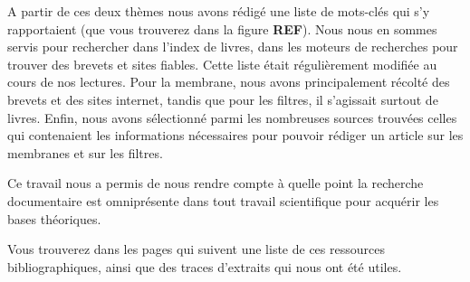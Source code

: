 \documentclass[a4paper, 11pt]{article}
\begin{document}
A partir de ces deux thèmes nous avons rédigé une liste de mots-clés qui s'y rapportaient (que vous trouverez dans la figure \textbf{REF}).%
 Nous nous en sommes servis pour rechercher dans l'index de livres, dans les moteurs de recherches pour trouver des brevets et sites fiables. Cette liste était régulièrement modifiée au cours de nos lectures. Pour la membrane, nous avons principalement récolté des brevets et des sites internet, tandis que pour les filtres, il s'agissait surtout de livres. 
Enfin, nous avons sélectionné parmi les nombreuses sources trouvées celles qui contenaient les informations nécessaires pour pouvoir rédiger un article sur les membranes et sur les filtres.
\newline

Ce travail nous a permis de nous rendre compte à quelle point la recherche documentaire est omniprésente dans tout travail scientifique pour acquérir les bases théoriques.
\newline

Vous trouverez dans les pages qui suivent une liste de ces ressources bibliographiques, ainsi que des traces d'extraits qui nous ont été utiles.

 
 
\end{document}
